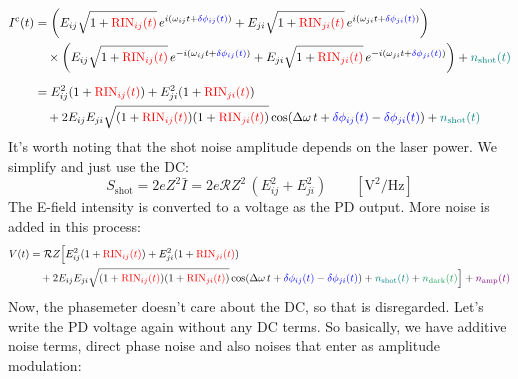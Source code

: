 \documentclass[11pt]{article}
\begin{document}
\begin{align*}
I^{\text{c}}(t) &= \left(E_{ij}\sqrt{1+{\color{red}\text{RIN}_{ij}(t)}}\,e^{i(\omega_{ij} t + {\color{blue}\delta\phi_{ij}(t)})} + E_{ji}\sqrt{1+{\color{red}\text{RIN}_{ji}(t)}}\,e^{i(\omega_{ji} t + {\color{blue}\delta\phi_{ji}(t)})}\right)\\
&\quad\times\left(E_{ij}\sqrt{1+{\color{red}\text{RIN}_{ij}(t)}}\,e^{-i(\omega_{ij} t + {\color{blue}\delta\phi_{ij}(t)})} + E_{ji}\sqrt{1+{\color{red}\text{RIN}_{ji}(t)}}\,e^{-i(\omega_{ji} t + {\color{blue}\delta\phi_{ji}(t)})}\right) + {\color{teal}n_\text{shot}(t)}\\[6pt]
&= E_{ij}^2(1+{\color{red}\text{RIN}_{ij}(t)}) + E_{ji}^2(1+{\color{red}\text{RIN}_{ji}(t)})\\
&\quad + 2E_{ij}E_{ji}\sqrt{(1+{\color{red}\text{RIN}_{ij}(t)})(1+{\color{red}\text{RIN}_{ji}(t)})}\cos(\Delta\omega\, t + {\color{blue}\delta\phi_{ij}(t)} - {\color{blue}\delta\phi_{ji}(t)}) + {\color{teal}n_\text{shot}(t)}
\end{align*}
\noindent
It's worth noting that the shot noise amplitude depends on the laser power. We simplify and just use the DC:
\begin{equation*}
    S_{\text{shot}} = 2eZ^2\bar{I} = 2e\mathcal{R}Z^2\,(E_{ij}^2 + E_{ji}^2) \qquad [\text{V}^2/\text{Hz}]
\end{equation*}
The E-field intensity is converted to a voltage as the PD output. More noise is added in this process:
\begin{align*}
    V(t) &= \mathcal{R} Z \Big[ E_{ij}^2(1+{\color{red}\text{RIN}_{ij}(t)}) + E_{ji}^2(1+{\color{red}\text{RIN}_{ji}(t)}) \\
    &\quad + 2E_{ij}E_{ji}\sqrt{(1+{\color{red}\text{RIN}_{ij}(t)})(1+{\color{red}\text{RIN}_{ji}(t)})}
    \cos(\Delta\omega\, t + {\color{blue}\delta\phi_{ij}(t)} - {\color{blue}\delta\phi_{ji}(t)}) + {\color{teal}n_\text{shot}(t)} + {\color{ForestGreen}n_\text{dark}(t)}\Big]+ {\color{violet}n_\text{amp}(t)}
\end{align*}
Now, the phasemeter doesn't care about the DC, so that is disregarded. Let's write the PD voltage again without any DC terms.
So basically, we have additive noise terms, direct phase noise and also noises that enter as amplitude modulation:
\end{document}
